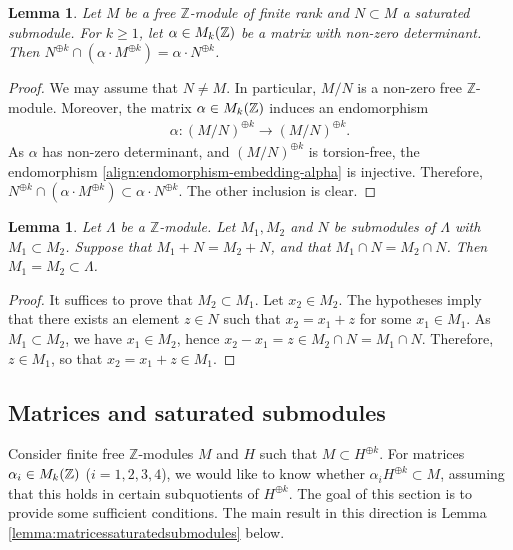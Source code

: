 \documentclass[a4paper,11pt,reqno]{amsart}
\numberwithin{equation}{section}
\theoremstyle{plain}
\newtheorem{lemma}[theorem]{Lemma}
\theoremstyle{definition}
\newcommand{\Z}{\mathbb Z}
\let\rm\relax
\newcommand{\rm}[1]{{\mathrm{#1}}}
\begin{document}
\begin{lemma} \label{lemma:saturated-matrices-embedding}
Let $M$ be a free $\Z$-module of finite rank and $N \subset M$ a saturated submodule. For $k \geq 1$, let $\alpha \in \rm{M}_k(\Z)$ be a matrix with non-zero determinant. Then $N^{\oplus k} \cap (\alpha \cdot M^{\oplus k}) = \alpha \cdot N^{\oplus k}$. 
\end{lemma}
\begin{proof}
We may assume that $N \neq M$. In particular, $M/N$ is a non-zero free $\Z$-module. Moreover, the matrix $\alpha \in \rm{M}_k(\Z)$ induces an endomorphism
\begin{align} \label{align:endomorphism-embedding-alpha}
\alpha \colon (M/N)^{\oplus k} \to (M/N)^{\oplus k}. 
\end{align}
As $\alpha$ has non-zero determinant, and $(M/N)^{\oplus k}$ is torsion-free, the endomorphism \eqref{align:endomorphism-embedding-alpha} is injective. 
Therefore, $N^{\oplus k} \cap (\alpha \cdot M^{\oplus k}) \subset \alpha \cdot N^{\oplus k}$. The other inclusion is clear. 
\end{proof}

\begin{lemma} \label{lemma:basic}
    Let $\Lambda$ be a $\Z$-module. Let $M_1,M_2$ and $N$ be submodules of $\Lambda$ with $M_1 \subset M_2$. Suppose that $M_1 + N = M_2 + N$, and that $M_1 \cap N = M_2 \cap N$. Then $M_1 = M_2 \subset \Lambda$. 
\end{lemma}
\begin{proof}
It suffices to prove that $M_2 \subset M_1$. Let $x_2 \in M_2$. The hypotheses imply that there exists an element $z \in N$ such that $x_2 = x_1 + z$ for some $x_1 \in M_1$. As $M_1 \subset M_2$, we have $x_1 \in M_2$, hence $x_2 - x_1 = z \in M_2 \cap N = M_1 \cap N$. Therefore, $z \in M_1$, so that $x_2 = x_1 + z \in M_1$. 
\end{proof}

\subsection{Matrices and saturated submodules} \label{subsec:matrix-saturated}
 Consider finite free $\Z$-modules $M$ and $H$ such that $M \subset H^{\oplus k}$. For matrices $\alpha_i \in \rm{M}_k(\Z)$ ($i = 1,2,3,4$), we would like to know whether $\alpha_i H^{\oplus k} \subset M$, assuming that this holds in certain subquotients of $H^{\oplus k}$. 
The goal of this section is to provide some sufficient conditions. 
The main result in this direction is Lemma \ref{lemma:matricessaturatedsubmodules} below. 
\end{document}
